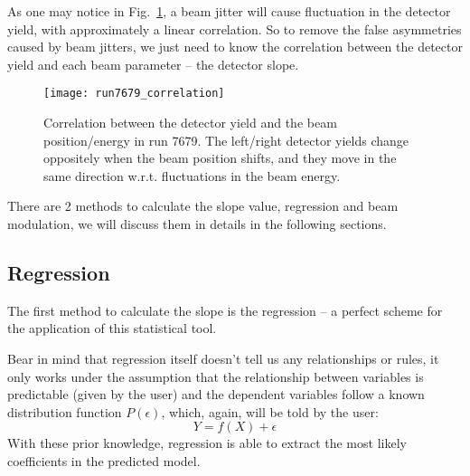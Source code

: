 As one may notice in Fig.~\ref{fig:correlation}, a beam jitter will cause 
fluctuation in the detector yield, with approximately a linear correlation.
So to remove the false asymmetries caused by beam jitters, we just need to
know the correlation between the detector yield and each beam parameter -- 
the detector slope. 

\begin{figure}[!h]
    \centering
    \texttt{[image: run7679\_correlation]}
    \caption{Correlation between the detector yield and the beam position/energy in run 7679.
    The left/right detector yields change oppositely when the beam position shifts,
    and they move in the same direction w.r.t. fluctuations in the beam energy.
    }
    \label{fig:correlation}
\end{figure}

There are 2 methods to calculate the slope value, regression and beam modulation,
we will discuss them in details in the following sections.

\subsection{Regression}

The first method to calculate the slope is the regression -- a perfect scheme for
the application of this statistical tool.

Bear in mind that regression itself doesn't tell us any relationships or rules, 
it only works under
the assumption that the relationship between variables is predictable (given by the user) 
and the dependent variables follow a known distribution function $P(\epsilon)$, which,
again, will be told by the user:
$$ Y = f(X) + \epsilon $$
With these prior knowledge, regression is able to extract the most likely 
coefficients in the predicted model.

\begin{comment}
For example, the famous least square fit is actually a linear regression 
$$ Y = c_0 + \sum c_i x_i + \epsilon $$
assuming Gaussian distribution of the dependent variable: $\epsilon \sim N(0, \sigma)$
Another frequenctly used scene is logistic regression for classification, which
is very similar to linear regression except f(X) will be converted into a
probability function, e.x. using the logistic function:
$$ h(z) = \frac{e^z}{1 + e^z} \quad z = f(X) $$

The assumpsion we made here is that the fluctuations in beam parameters in small, 
compared to their normal yield -- this can be verified by their yield plot. So
that we can use first order fit to model the detector's response to change in
beam parameters. Therefore the `true' asymmetry will be:
\begin{equation}
    \CA_{cor} = \CA_{raw} - \sum_i \beta_i\Delta M_i
\end{equation}
where $\CA_{cor}$ is the corrected asymmetry, $\beta_i = \frac{\partial \CA_{raw}}{\Delta M_i}$ 
is the slope and $\Delta M$ is the difference of BPM yield bewtween 
opposite helicities windows, i sums over all 5 chosen BPMs.
\end{comment}

